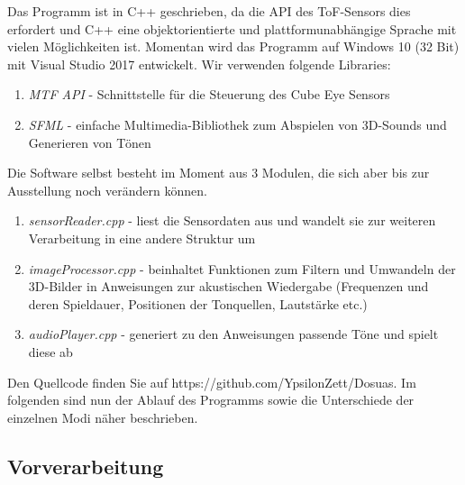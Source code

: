 \documentclass[a4paper,12pt,ngerman]{scrartcl}
\begin{document}
Das Programm ist in C++ geschrieben, da die API des ToF-Sensors dies erfordert und C++ eine objektorientierte und plattformunabhängige Sprache mit vielen Möglichkeiten ist. Momentan wird das Programm
auf Windows 10 (32 Bit) mit Visual Studio 2017 entwickelt. Wir verwenden folgende Libraries:
\begin{enumerate}
	\item \textit{MTF API} - Schnittstelle für die Steuerung des Cube Eye Sensors
	\item \textit{SFML} - einfache Multimedia-Bibliothek zum Abspielen von 3D-Sounds und Generieren von Tönen
\end{enumerate} 
Die Software selbst besteht im Moment aus 3 Modulen, die sich aber bis zur Ausstellung noch verändern 
können.
\begin{enumerate}
	\item \textit{sensorReader.cpp} - liest die Sensordaten aus und wandelt sie zur weiteren Verarbeitung in eine andere Struktur um
	\item \textit{imageProcessor.cpp} - beinhaltet Funktionen zum Filtern und Umwandeln der 3D-Bilder in Anweisungen zur akustischen Wiedergabe (Frequenzen und deren Spieldauer, Positionen der Tonquellen, Lautstärke etc.)
	\item \textit{audioPlayer.cpp} - generiert zu den Anweisungen passende Töne und spielt diese ab
\end{enumerate}
Den Quellcode finden Sie auf https://github.com/YpsilonZett/Dosuas.
Im folgenden sind nun der Ablauf des Programms sowie die Unterschiede der einzelnen Modi näher beschrieben.

\subsection{Vorverarbeitung}
\end{document}
